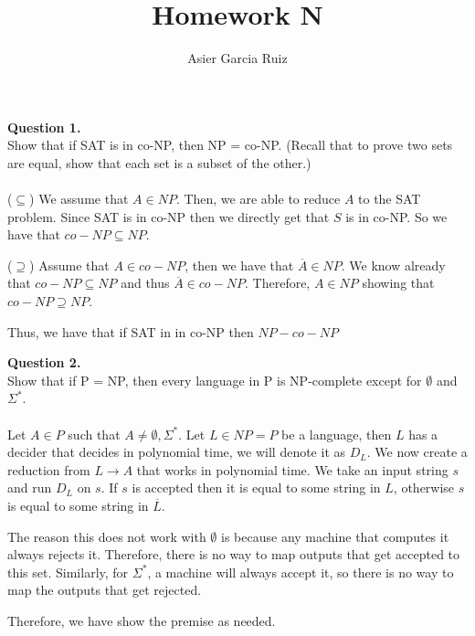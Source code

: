 \documentclass{article}
\title{Homework N}
\author{Asier Garcia Ruiz}
\newenvironment{question}[2]
{
    {\large \textbf{Question #1.}}\\
    #2\\\\
}{\newpage}
\begin{document}
\maketitle

\begin{question}
    {1}
    {Show that if SAT is in co-NP, then NP = co-NP. (Recall that to prove two sets are
        equal, show that each set is a subset of the other.)}

    ($\subseteq$) We assume that $A \in NP$. Then, we are able to reduce $A$ to the SAT problem. Since SAT is in co-NP then
    we directly get that $S$ is in co-NP. So we have that $co-NP \subseteq NP$.

    ($\supseteq$) Assume that $A \in co-NP$, then we have that $\overline{A} \in NP$. We know already that $co-NP \subseteq NP$ and
    thus $\overline{A} \in co-NP$. Therefore, $A \in NP$ showing that $co-NP \supseteq NP$.

    Thus, we have that if SAT in in co-NP then $NP - co-NP$
\end{question}

\begin{question}
    {2}
    {Show that if P = NP, then every language in P is NP-complete except for $\emptyset$
        and $\Sigma^*$.}

    Let $A \in P$ such that $A \neq \emptyset, \Sigma^*$. Let $L \in NP = P$ be a language, then $L$ has a decider that decides in
    polynomial time, we will denote it as $D_L$. We now create a reduction from $L \to A$ that works in polynomial time.
    We take an input string $s$ and run $D_L$ on $s$. If $s$ is accepted then it is equal to some string in $L$, otherwise
    $s$ is equal to some string in $\overline{L}$.

    The reason this does not work with $\emptyset$ is because any machine that computes it always rejects it. Therefore,
    there is no way to map outputs that get accepted to this set. Similarly, for $\Sigma^*$, a machine will always accept it,
    so there is no way to map the outputs that get rejected.

    Therefore, we have show the premise as needed.
\end{question}
\end{document}
